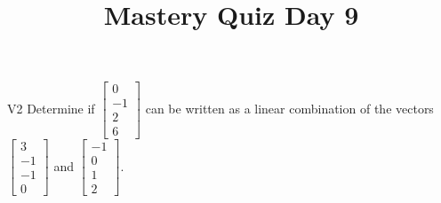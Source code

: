 \documentclass{sbgLAquiz}
\title{Mastery Quiz Day 9 }
\begin{document}
\begin{problem}{V2}
Determine if $\begin{bmatrix}0 \\ -1 \\ 2 \\ 6 \end{bmatrix}$ can be written as a linear combination of the vectors $\begin{bmatrix} 3 \\ -1 \\ -1 \\ 0 \end{bmatrix}$ and $\begin{bmatrix} -1 \\ 0 \\ 1 \\ 2 \end{bmatrix}$.
\end{problem}
\end{document}
